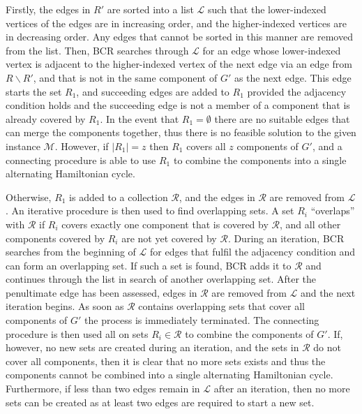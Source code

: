 \documentclass{elsarticle}
\begin{document}
Firstly, the edges in $R'$ are sorted into a list $\mathcal{L}$ such that the lower-indexed vertices of the edges are in increasing order, and the higher-indexed vertices are in decreasing order. Any edges that cannot be sorted in this manner are removed from the list. Then, BCR searches through $\mathcal{L}$ for an edge whose lower-indexed vertex is adjacent to the higher-indexed vertex of the next edge via an edge from $R \backslash R'$, and that is not in the same component of $G'$ as the next edge. This edge starts the set $R_1$, and succeeding edges are added to $R_1$ provided the adjacency condition holds and the succeeding edge is not a member of a component that is already covered by $R_1$. In the event that $R_1 = \emptyset$ there are no suitable edges that can merge the components together, thus there is no feasible solution to the given instance $\mathcal{M}$. However, if $|R_1| = z$ then $R_1$ covers all $z$ components of $G'$, and a connecting procedure is able to use $R_1$ to combine the components into a single alternating Hamiltonian cycle.

Otherwise, $R_1$ is added to a collection $\mathcal{R}$, and the edges in $\mathcal{R}$ are removed from $\mathcal{L}$. An iterative procedure is then used to find overlapping sets. A set $R_i$ ``overlaps'' with $\mathcal{R}$ if $R_i$ covers exactly one component that is covered by $\mathcal{R}$, and all other components covered by $R_i$ are not yet covered by $\mathcal{R}$. During an iteration, BCR searches from the beginning of $\mathcal{L}$ for edges that fulfil the adjacency condition and can form an overlapping set. If such a set is found, BCR adds it to $\mathcal{R}$ and continues through the list in search of another overlapping set. After the penultimate edge has been assessed, edges in $\mathcal{R}$ are removed from $\mathcal{L}$ and the next iteration begins. As soon as $\mathcal{R}$ contains overlapping sets that cover all components of $G'$ the process is immediately terminated. The connecting procedure is then used all on sets $R_i \in \mathcal{R}$ to combine the components of $G'$. If, however, no new sets are created during an iteration, and the sets in $\mathcal{R}$ do not cover all components, then it is clear that no more sets exists and thus the components cannot be combined into a single alternating Hamiltonian cycle. Furthermore, if less than two edges remain in $\mathcal{L}$ after an iteration, then no more sets can be created as at least two edges are required to start a new set. 
\end{document}
